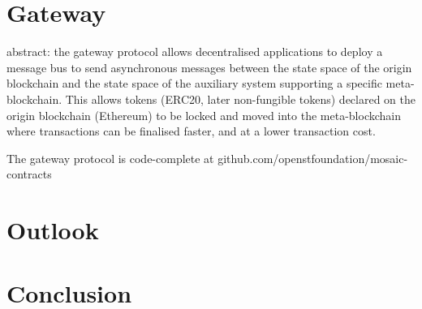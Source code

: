 \documentclass[12pt,a4paper]{article}
\begin{document}

\section{Gateway}

abstract:
the gateway protocol allows decentralised applications to deploy a message bus to send asynchronous messages between the state space of the origin blockchain and the state space of the auxiliary system supporting a specific meta-blockchain.
This allows tokens (ERC20, later non-fungible tokens) declared on the origin blockchain (Ethereum) to be locked and moved into the meta-blockchain where transactions can be finalised faster, and at a lower transaction cost. 

The gateway protocol is code-complete at github.com/openstfoundation/mosaic-contracts

%
%
\section{Outlook}

%
%
\section{Conclusion}







\end{document}
